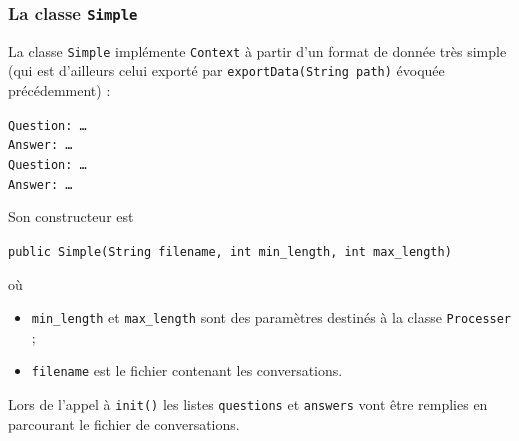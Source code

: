 \documentclass[10pt,a4paper]{article}
\newcommand\tab[1][0.5cm]{\hspace*{#1}}
\begin{document}
\subsubsection{La classe \texttt{Simple}}
La classe \texttt{Simple} implémente \texttt{Context} à partir d'un format de donnée très simple (qui est d'ailleurs celui exporté par \texttt{exportData(String path)} évoquée précédemment) :
\begin{center}
\texttt{Question: \ldots} \\
\texttt{Answer: \ldots} \\
\texttt{Question: \ldots} \\
\texttt{Answer: \ldots} \\
\end{center}
Son constructeur est 
\begin{center}
\texttt{public Simple(String filename, int min\_length, int max\_length)}
\end{center}
où
\begin{itemize}
\item \texttt{min\_length} et \texttt{max\_length} sont des paramètres destinés à la classe \texttt{Processer} ;
\item \texttt{filename} est le fichier contenant les conversations.
\end{itemize}
\tab  Lors de l'appel à \texttt{init()} les listes \texttt{questions} et \texttt{answers} vont être remplies en parcourant le fichier de conversations.
\end{document}

